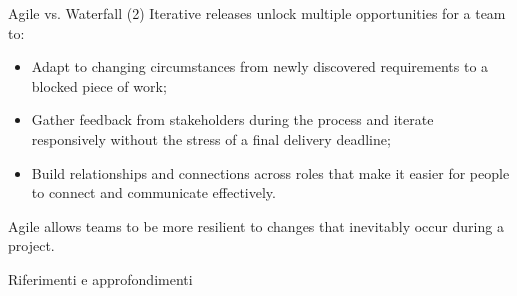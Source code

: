 \documentclass[
    notheorems,
    11pt,
    compress,
    aspectratio=169
]{beamer}
\begin{document}
\begin{frame}{Agile vs. Waterfall (2)}
    Iterative releases unlock multiple opportunities for a team to:

    \begin{itemize}
        \item Adapt to changing circumstances from newly discovered requirements to a blocked piece of work;
        \pause
        \item Gather feedback from stakeholders during the process and iterate responsively without the stress of a final delivery deadline;
        \pause
        \item Build relationships and connections across roles that make it easier for people to connect and communicate effectively.
    \end{itemize}

    \vspace{0.5cm}

    \pause
    Agile allows teams to be more resilient to changes that inevitably occur during a project.
\end{frame}

%
%        


\begin{frame}{Riferimenti e approfondimenti}
    \printbibliography
\end{frame}

\end{document}
